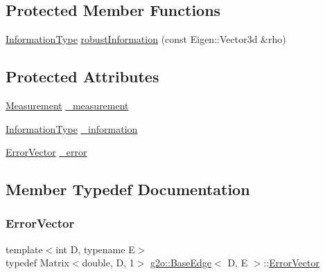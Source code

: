 \subsection*{Protected Member Functions}
\begin{DoxyCompactItemize}
\item 
\mbox{\hyperlink{classg2o_1_1_base_edge_a2e5a33343ac3f189d8a7d5ee4d8b73fc}{Information\+Type}} \mbox{\hyperlink{classg2o_1_1_base_edge_a069937ed6fadf557368cd0fce7ab2f59}{robust\+Information}} (const Eigen\+::\+Vector3d \&rho)
\end{DoxyCompactItemize}
\subsection*{Protected Attributes}
\begin{DoxyCompactItemize}
\item 
\mbox{\hyperlink{classg2o_1_1_base_edge_a2c148abba650a20b8c7eed75d3e2211e}{Measurement}} \mbox{\hyperlink{classg2o_1_1_base_edge_af2a6ab1df6e91601b4cab23e0e99e034}{\+\_\+measurement}}
\item 
\mbox{\hyperlink{classg2o_1_1_base_edge_a2e5a33343ac3f189d8a7d5ee4d8b73fc}{Information\+Type}} \mbox{\hyperlink{classg2o_1_1_base_edge_a49f11e3d1eaa8e666e1d4d3607279377}{\+\_\+information}}
\item 
\mbox{\hyperlink{classg2o_1_1_base_edge_af5b558dd24e4be2e437563cae4b3550d}{Error\+Vector}} \mbox{\hyperlink{classg2o_1_1_base_edge_af31f4b0a67bb12b4de4a32dc42467836}{\+\_\+error}}
\end{DoxyCompactItemize}


\subsection{Member Typedef Documentation}
\mbox{\label{classg2o_1_1_base_edge_af5b558dd24e4be2e437563cae4b3550d}} 
\subsubsection{\texorpdfstring{Error\+Vector}{ErrorVector}}
{\footnotesize\ttfamily template$<$int D, typename E$>$ \\
typedef Matrix$<$double, D, 1$>$ \mbox{\hyperlink{classg2o_1_1_base_edge}{g2o\+::\+Base\+Edge}}$<$ D, E $>$\+::\mbox{\hyperlink{classg2o_1_1_base_edge_af5b558dd24e4be2e437563cae4b3550d}{Error\+Vector}}}

